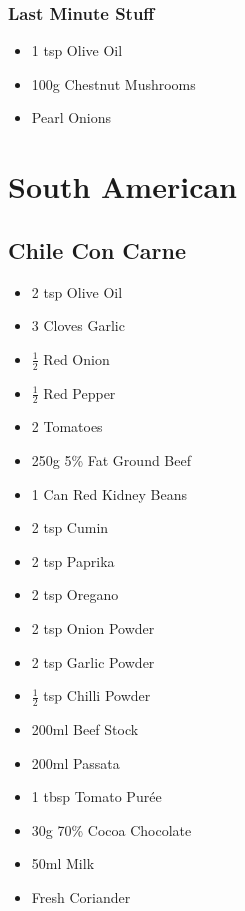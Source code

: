 \documentclass[11pt, english]{article}
\begin{document}
		\subsubsection*{Last Minute Stuff}

	\begin{itemize}
	\setlength\itemsep{0cm}
		\item 1 tsp Olive Oil
		\item 100g Chestnut Mushrooms
		\item Pearl Onions
	\end{itemize}

\newpage

\section{South American}

	\subsection{Chile Con Carne}

	\begin{itemize}
	\setlength\itemsep{0cm}
		\item 2 tsp Olive Oil
		\item 3 Cloves Garlic
		\item $\frac{1}{2}$ Red Onion
		\item $\frac{1}{2}$ Red Pepper
		\item 2 Tomatoes
		\item 250g 5\% Fat Ground Beef
		\item 1 Can Red Kidney Beans
		\item 2 tsp Cumin
		\item 2 tsp Paprika
		\item 2 tsp Oregano
		\item 2 tsp Onion Powder
		\item 2 tsp Garlic Powder
		\item $\frac{1}{2}$ tsp Chilli Powder
		\item 200ml Beef Stock
		\item 200ml Passata
		\item 1 tbsp Tomato Pur\'{e}e
		\item 30g 70\% Cocoa Chocolate
		\item 50ml Milk
		\item Fresh Coriander
	\end{itemize}

\newpage
\end{document}
